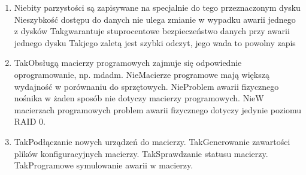 \begin{enumerate}
	\newpage
	\item {}%
	{Nie}{bity parzystości są zapisywane na specjalnie do tego przeznaczonym dysku}%
	{Nie}{szybkość dostępu do danych nie ulega zmianie w wypadku awarii jednego z dysków}%
	{Tak}{gwarantuje stuprocentowe bezpieczeństwo danych przy awarii jednego dysku}%
	{Tak}{jego zaletą jest szybki odczyt, jego wada to powolny zapis}
	\item {}%
	{Tak}{Obsługą macierzy programowych zajmuje się odpowiednie oprogramowanie, np. mdadm.}%
	{Nie}{Macierze programowe mają większą wydajność w porównaniu do sprzętowych.}%
	{Nie}{Problem awarii fizycznego nośnika w żaden sposób nie dotyczy macierzy programowych.}%
	{Nie}{W macierzach programowych problem awarii fizycznego dotyczy jedynie poziomu RAID 0.}
	\item {}%
	{Tak}{Podłączanie nowych urządzeń do macierzy.}%
	{Tak}{Generowanie zawartości plików konfiguracyjnych macierzy.}%
	{Tak}{Sprawdzanie statusu macierzy.}%
	{Tak}{Programowe symulowanie awarii w macierzy.}
	
	
\end{enumerate}